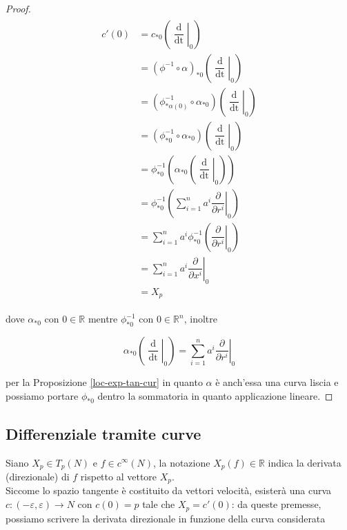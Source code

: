\begin{proof}
	\begin{align}
		\begin{split}
			c'(0) &= c_{*0} \left( \left. \dfrac{\operatorname{d}}{\operatorname{dt}} \right|_{0} \right)\\
			&= (\phi^{-1} \circ \alpha)_{*0} \left( \left. \dfrac{\operatorname{d}}{\operatorname{dt}} \right|_{0} \right)\\
			&= (\phi^{-1}_{*\alpha(0)} \circ \alpha_{*0}) \left( \left. \dfrac{\operatorname{d}}{\operatorname{dt}} \right|_{0} \right)\\
			&= (\phi^{-1}_{*0} \circ \alpha_{*0}) \left( \left. \dfrac{\operatorname{d}}{\operatorname{dt}} \right|_{0} \right)\\
			&= \phi^{-1}_{*0} \left( \alpha_{*0} \left( \left. \dfrac{\operatorname{d}}{\operatorname{dt}} \right|_{0} \right) \right)\\
			&= \phi^{-1}_{*0} \left( \sum_{i=1}^{n} a^{i} \left. \dfrac{\partial}{\partial r^{i}} \right|_{0} \right)\\
			&= \sum_{i=1}^{n} a^{i} \phi^{-1}_{*0} \left( \left. \dfrac{\partial}{\partial r^{i}} \right|_{0} \right)\\
			&= \sum_{i=1}^{n} a^{i} \left. \dfrac{\partial}{\partial x^{i}} \right|_{0}\\
			&= X_{p}
		\end{split}
	\end{align}

	dove $ \alpha_{*0} $ con $ 0 \in \mathbb{R} $ mentre $ \phi^{-1}_{*0} $ con $ 0 \in \mathbb{R}^{n} $, inoltre
	
	\begin{equation}
		\alpha_{*0} \left( \left. \dfrac{\operatorname{d}}{\operatorname{dt}} \right|_{0} \right) = \sum_{i=1}^{n} a^{i} \left. \dfrac{\partial}{\partial r^{i}} \right|_{0}
	\end{equation}

	per la Proposizione \ref{loc-exp-tan-cur} in quanto $ \alpha $ è anch'essa una curva liscia e possiamo portare $ \phi_{*0} $ dentro la sommatoria in quanto applicazione lineare.
\end{proof}

\subsection{Differenziale tramite curve}

Siano $ X_{p} \in T_{p}(N) $ e $ f \in c^{\infty}(N) $, la notazione $ X_{p}(f) \in \mathbb{R} $ indica la derivata (direzionale) di $ f $ rispetto al vettore $ X_{p} $.\\
Siccome lo spazio tangente è costituito da vettori velocità, esisterà una curva $ c : (-\varepsilon,\varepsilon) \to N $ con $ c(0) = p $ tale che $ X_{p} = c'(0) $: da queste premesse, possiamo scrivere la derivata direzionale in funzione della curva considerata


